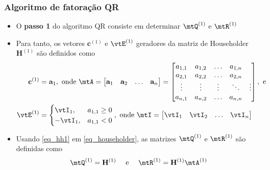\begin{frame}
  \frametitle{Algoritmo de fatoração QR}
  \begin{itemize}
    \item O \textbf{passo 1} do algoritmo QR consiste em determinar $\mtQ^{(1)}$ e $\mtR^{(1)}$
    \item Para tanto, os vetores $\mathbf{c}^{(1)}$ e $\vtE^{(1)}$ geradores da matriz de Householder $\mathbf{H}^{(1)}$ são definidos como
    \begin{equation}\label{eq_hh1}
      \begin{split}
      \mathbf{c}^{(1)} &= \mathbf{a}_1, \text{ onde }
      \mtA = \left[\begin{matrix}
        \mathbf{a}_1 & \mathbf{a}_2 & \ldots & \mathbf{a}_n
      \end{matrix}\right] = \left[\begin{matrix}
        a_{1,1} & a_{1,2} & \ldots & a_{1,n} \\
        a_{2,1} & a_{2,2} & \ldots & a_{2,n} \\
        \vdots & \vdots & \vdots & \ddots & \vdots \\
        a_{n,1} & a_{n,2} & \ldots & a_{n,n}
      \end{matrix}\right], \text{ e }\\
      \vtE^{(1)} &=
      \begin{cases}
        \vtI_1, & a_{1,1} \geq 0 \\
        -\vtI_1, & a_{1,1} < 0
      \end{cases}, \text{ onde } \mtI = \left[\begin{matrix}
        \vtI_1 & \vtI_2 & \ldots & \vtI_n
      \end{matrix}\right]
      \end{split}
    \end{equation}
    \item Usando \eqref{eq_hh1} em \eqref{eq_householder}, as matrizes $\mtQ^{(1)}$ e $\mtR^{(1)}$ são definidas como
    \begin{equation}
      \mtQ^{(1)} = \mathbf{H}^{(1)} \quad \text{ e } \quad  \mtR^{(1)} = \mathbf{H}^{(1)}\mtA^{(1)}
    \end{equation}
  \end{itemize}
\end{frame}

